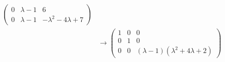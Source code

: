 {\begin{solution}
\begin{align*}
\begin{pmatrix}
                0 & \lambda-1 & 6                     \\
                0 & \lambda-1 & -\lambda^2-4\lambda+7
            \end{pmatrix}                     \\
                                   & \longrightarrow
            \begin{pmatrix}
                1 & 0 & 0                                                       \\
                0 & 1 & 0                                                       \\
                0 & 0 & \left(\lambda-1\right)\left(\lambda^2+4\lambda+2\right)
            \end{pmatrix}
        \end{align*}
    \end{solution}
}